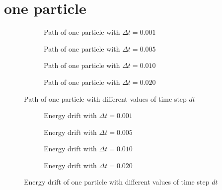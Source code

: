 \documentclass[10pt,a4paper,aps,twocolumn,secnumarabic,numerical,balancelastpage,nofootinbib,superscriptaddress]{revtex4-2}
\begin{document}
	\section{one particle}
		
	\begin{figure*}[htb]
		\centering
		\begin{subfigure}{.45\textwidth}
			\hspace*{-2.6cm}\scalebox{0.9}{}
			\caption{Path of one particle with $\Delta t=0.001$}
		\end{subfigure}
		\begin{subfigure}{.45\textwidth}
			\hspace*{-2.6cm}\scalebox{0.9}{}
			\caption{Path of one particle with $\Delta t=0.005$}
		\end{subfigure}
		\begin{subfigure}{.45\textwidth}
			\hspace*{-2.6cm}\scalebox{0.9}{}
			\caption{Path of one particle with $\Delta t=0.010$}
		\end{subfigure}
		\begin{subfigure}{.45\textwidth}
			\hspace*{-2.6cm}\scalebox{0.9}{}
			\caption{Path of one particle with $\Delta t=0.020$}
		\end{subfigure}
		\caption{Path of one particle with different values of time step $dt$}
	\end{figure*}
	
	\begin{figure*}[htb]
		\centering
		\begin{subfigure}{.45\textwidth}
			\scalebox{0.6}{}
			\caption{Energy drift with $\Delta t=0.001$}
		\end{subfigure}
		\begin{subfigure}{.45\textwidth}
			\scalebox{0.6}{}
			\caption{Energy drift with $\Delta t=0.005$}
		\end{subfigure}
		\begin{subfigure}{.45\textwidth}
			\scalebox{0.6}{}
			\caption{Energy drift with $\Delta t=0.010$}
		\end{subfigure}
		\begin{subfigure}{.45\textwidth}
			\scalebox{0.6}{}
			\caption{Energy drift with $\Delta t=0.020$}
		\end{subfigure}
		\caption{Energy drift of one particle with different values of time step $dt$}
	\end{figure*}
	
\end{document}

